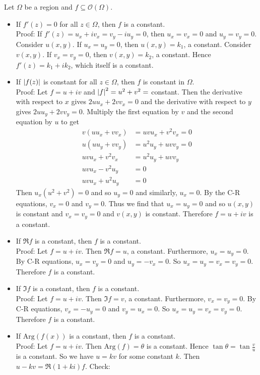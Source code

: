 \documentclass[12pt]{article}
\begin{document}
Let $\Omega$ be a region and $f \subseteq \mathcal{O}(\Omega)$. \begin{itemize} 
\item If $f'(z) = 0$ for all $z \in \Omega$, then $f$ is a constant. \\
Proof: If $f'(z) = u_x + iv_x = v_y - iu_y = 0$, then $u_x = v_x = 0$ and $u_y = v_y = 0$. Consider $u(x,y)$. If $u_x = u_y = 0$, then $u(x,y) = k_1$, a constant. Consider $v(x,y)$. If $v_x = v_y = 0$, then $v(x,y) = k_2$, a constant. Hence $f'(z) = k_1 + ik_2$, which itself is a constant. 
\item If $\abs{f(z)}$ is constant for all $z \in \Omega$, then $f$ is constant in $\Omega$. \\
Proof: Let $f = u + iv$ and $\abs{f}^2 = u^2 + v^2 = $ constant. Then the derivative with respect to $x$ gives $2uu_x + 2vv_x = 0$ and the derivative with respect to $y$ gives $2uu_y + 2vv_y = 0$. Multiply the first equation by $v$ and the second equation by $u$ to get $$ \begin{aligned}v(uu_x + vv_x) &= uvu_x + v^2v_x = 0 \\ u(uu_y + vv_y) &= u^2u_y + uvv_y = 0 \\ uvu_x + v^2v_x &= u^2u_y + uvv_y \\ uvu_x - v^2u_y &= 0 \\ uvu_x + u^2u_y &= 0 \end{aligned} $$ 
Then $u_x(u^2 + v^2) = 0$ and so $u_y = 0$ and similarly, $u_x = 0$. By the C-R equations, $v_x = 0$ and $v_y = 0$. Thus we find that $u_x = u_y = 0$ and so $u(x,y)$ is constant and $v_x = v_y = 0$ and $v(x,y)$ is constant. Therefore $f = u + iv$ is a constant. 
\item If $\Re{f}$ is a constant, then $f$ is a constant. \\ 
Proof: Let $f = u + iv$. Then $\Re{f} = u$, a constant. Furthermore, $u_x = u_y = 0$. By C-R equations, $u_x = v_y = 0$ and $u_y = -v_x = 0$. So $u_x = u_y = v_x = v_y = 0$. Therefore $f$ is a constant. 
\item If $\Im{f}$ is a constant, then $f$ is a constant. \\ 
Proof: Let $f=  u + iv$. Then $\Im{f} = v$, a constant. Furthermore, $v_x = v_y = 0$. By C-R equations, $v_x = -u_y = 0$ and $v_y = u_x = 0$. So $u_x = u_y = v_x = v_y = 0$. Therefore $f$ is a constant. 
\item If $\text{Arg}(f(x))$ is a constant, then $f$ is a constant. \\ 
Proof: Let $f = u + iv$. Then $\text{Arg}(f) = \theta$ is a constant. Hence $\tan \theta = \tan \frac{v}{u}$ is a constant. So we have $u = kv$ for some constant $k$. Then $u - kv = \Re{(1+ki)f}$. Check: 

\end{itemize}
\end{document}
